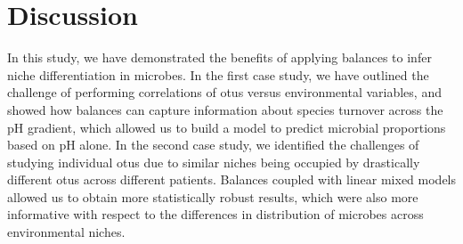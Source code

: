  \section{ Discussion}
 In this study, we have demonstrated the benefits of applying balances to infer niche differentiation in microbes.  In the first case study, we have outlined the challenge of performing correlations of \gls{otu}s versus environmental variables, and showed how balances can capture information about species turnover across the pH gradient, which allowed us to build a model to predict microbial proportions based on pH alone.  In the second case study, we identified the challenges of studying individual \gls{otu}s due to similar niches being occupied by drastically different \gls{otu}s across different patients. Balances coupled with linear mixed models allowed us to obtain more statistically robust results, which were also more informative with respect to the differences in distribution of microbes across environmental niches.\par
